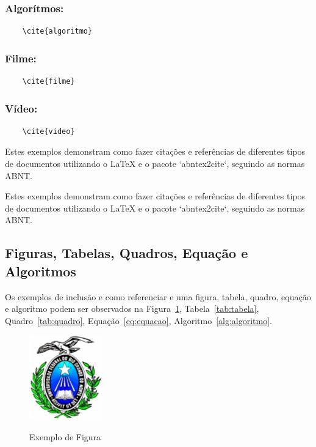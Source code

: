 \subsubsection{Algorítmos:}
\begin{verbatim}
    \cite{algoritmo}
\end{verbatim}
\cite{algoritmo}

\subsubsection{Filme:}
\begin{verbatim}
    \cite{filme}
\end{verbatim}
\cite{filme}

\subsubsection{Vídeo:}
\begin{verbatim}
    \cite{video}
\end{verbatim}
\cite{video}

Estes exemplos demonstram como fazer citações e referências de diferentes tipos de documentos utilizando o LaTeX e o pacote `abntex2cite`, seguindo as normas ABNT.

Estes exemplos demonstram como fazer citações e referências de diferentes tipos de documentos utilizando o LaTeX e o pacote `abntex2cite`, seguindo as normas ABNT.

    \subsection{\textbf{Figuras, Tabelas, Quadros, Equação e Algoritmos} }       
    Os exemplos de inclusão e como referenciar e uma figura, tabela, quadro, equação e algoritmo podem ser observados na Figura~\ref{fig:figura}, Tabela~\ref{tab:tabela}, Quadro~\ref{tab:quadro}, Equação~\ref{eq:equacao}, Algoritmo~\ref{alg:algoritmo}.
    
    \begin{figure}[h]
        \centering
        \caption{Exemplo de Figura}
        \includegraphics{lib/Logoufrn.jpg}
        \label{fig:figura}
    \end{figure}
    
